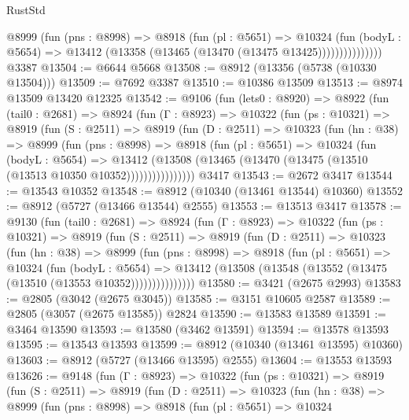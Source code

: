 \begin{lexlean}{RustStd}
\begin{coremodule}
                  @8999
                    (fun (pns : @8998) =>
                    @8918
                      (fun (pl : @5651) =>
                      @10324
                        (fun (bodyL : @5654) =>
                        @13412 (@13358 (@13465 (@13470 (@13475 @13425)))))))))))))))
    @3387
@13504 := @6644 @5668
@13508 := @8912 (@13356 (@5738 (@10330 @13504)))
@13509 := @7692 @3387
@13510 := @10386 @13509
@13513 := @8974 @13509 @13420 @12325
@13542 := @9106
    (fun (lets0 : @8920) =>
    @8922
      (fun (tail0 : @2681) =>
      @8924
        (fun (Γ : @8923) =>
        @10322
          (fun (ps : @10321) =>
          @8919
            (fun (S : @2511) =>
            @8919
              (fun (D : @2511) =>
              @10323
                (fun (hn : @38) =>
                @8999
                  (fun (pns : @8998) =>
                  @8918
                    (fun (pl : @5651) =>
                    @10324
                      (fun (bodyL : @5654) =>
                      @13412
                        (@13508
                          (@13465 (@13470 (@13475 (@13510 (@13513 @10350 @10352))))))))))))))))
    @3417
@13543 := @2672 @3417
@13544 := @13543 @10352
@13548 := @8912 (@10340 (@13461 @13544) @10360)
@13552 := @8912 (@5727 (@13466 @13544) @2555)
@13553 := @13513 @3417
@13578 := @9130
    (fun (tail0 : @2681) =>
    @8924
      (fun (Γ : @8923) =>
      @10322
        (fun (ps : @10321) =>
        @8919
          (fun (S : @2511) =>
          @8919
            (fun (D : @2511) =>
            @10323
              (fun (hn : @38) =>
              @8999
                (fun (pns : @8998) =>
                @8918
                  (fun (pl : @5651) =>
                  @10324
                    (fun (bodyL : @5654) =>
                    @13412 (@13508 (@13548 (@13552 (@13475 (@13510 (@13553 @10352)))))))))))))))
@13580 := @3421 (@2675 @2993)
@13583 := @2805 (@3042 (@2675 @3045))
@13585 := @3151 @10605 @2587
@13589 := @2805 (@3057 (@2675 @13585)) @2824
@13590 := @13583 @13589
@13591 := @3464 @13590
@13593 := @13580 (@3462 @13591)
@13594 := @13578 @13593
@13595 := @13543 @13593
@13599 := @8912 (@10340 (@13461 @13595) @10360)
@13603 := @8912 (@5727 (@13466 @13595) @2555)
@13604 := @13553 @13593
@13626 := @9148
    (fun (Γ : @8923) =>
    @10322
      (fun (ps : @10321) =>
      @8919
        (fun (S : @2511) =>
        @8919
          (fun (D : @2511) =>
          @10323
            (fun (hn : @38) =>
            @8999
              (fun (pns : @8998) =>
              @8918
                (fun (pl : @5651) =>
                @10324

\end{coremodule}
\end{lexlean}
